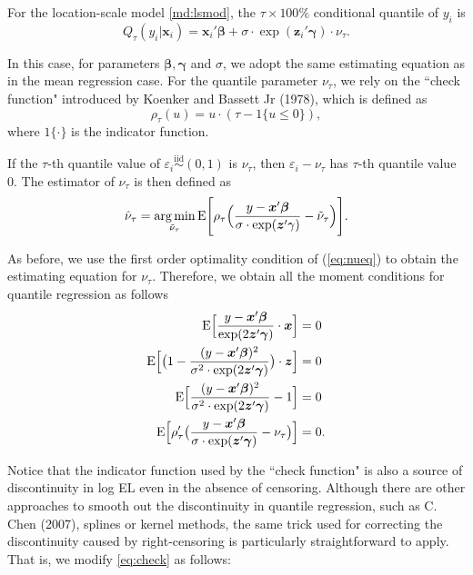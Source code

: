 \documentclass[article]{jss}
\renewcommand{\|}{\,|\,}
\begin{document}
For the location-scale model \eqref{md:lsmod}, the \(\tau\times 100\%\) conditional quantile of \(y_i\) is
\begin{equation} \label{eq:lsqr}
  Q_{\tau}(y_i|\bm x_i) = \bm x_i' \bm \beta+ \sigma\cdot\exp(\bm z_i' \bm \gamma)\cdot\nu_{\tau}.
\end{equation}

In this case, for parameters \(\bm \beta,\bm \gamma\) and \(\sigma\), we adopt the same estimating equation as in the mean regression case. For the quantile parameter \(\nu_{\tau}\), we rely on the ``check function" introduced by Koenker and Bassett Jr (1978), which is defined as
\begin{equation}\label{eq:check}
\rho_\tau(u) = u\cdot(\tau - \mathfrak 1 \{u \le 0\}),
\end{equation}
where \(\mathfrak 1\{\cdot\}\) is the indicator function.

If the \(\tau\)-th quantile value of \(\varepsilon_i\stackrel {\textrm{iid}}{\sim}(0,1)\) is \(\nu_{\tau}\), then \(\varepsilon_i-\nu_{\tau}\) has \(\tau\)-th quantile value \(0\). The estimator of \(\nu_{\tau}\) is then defined as
\begin{equation}\label{eq:nueq}
  \hat\nu_{\tau} = \mathop{\mathrm{arg\,min}}_{\tilde\nu_{\tau}} \textrm{E}\Biggl[\rho_{\tau}\Bigl(\frac{y-\bm x'\bm \beta}{\sigma\cdot\exp(\bm z'\gamma)}-\tilde\nu_{\tau}\Bigr)\Biggr].
\end{equation}

As before, we use the first order optimality condition of (\ref{eq:nueq}) to obtain the estimating equation for \(\nu_{\tau}\). Therefore, we obtain all the moment conditions for quantile regression as follows
\begin{equation} \label{eq:qrls}
\begin{split}
  \textrm{E}\Bigl[\frac{y-\bm x'\bm \beta}{\exp(2\bm z'\bm \gamma)}\cdot\bm x\Bigr] &= 0 \\
  \textrm{E}\Bigl[\bigl(1-\frac{(y-\bm x'\bm \beta)^2}{\sigma^2\cdot\exp(2\bm z'\bm \gamma)}\bigr)\cdot\bm z\Bigr] &= 0 \\
  \textrm{E}\Bigl[\frac{(y-\bm x'\bm \beta)^2}{\sigma^2\cdot\exp(2\bm z'\bm \gamma)}-1\Bigr] &= 0 \\
  \textrm{E}\Bigl[\rho'_{\tau}\bigl(\frac{y-\bm x'\bm \beta}{\sigma\cdot\exp(\bm z'\bm \gamma)}-\nu_{\tau}\bigr)\Bigr] &= 0.
\end{split}
\end{equation}

Notice that the indicator function used by the ``check function" is also a source of discontinuity in log EL even in the absence of censoring. Although there are other approaches to smooth out the discontinuity in quantile regression, such as C. Chen (2007), splines or kernel methods, the same trick used for correcting the discontinuity caused by right-censoring is particularly straightforward to apply. That is, we modify \eqref{eq:check} as follows:
\end{document}
